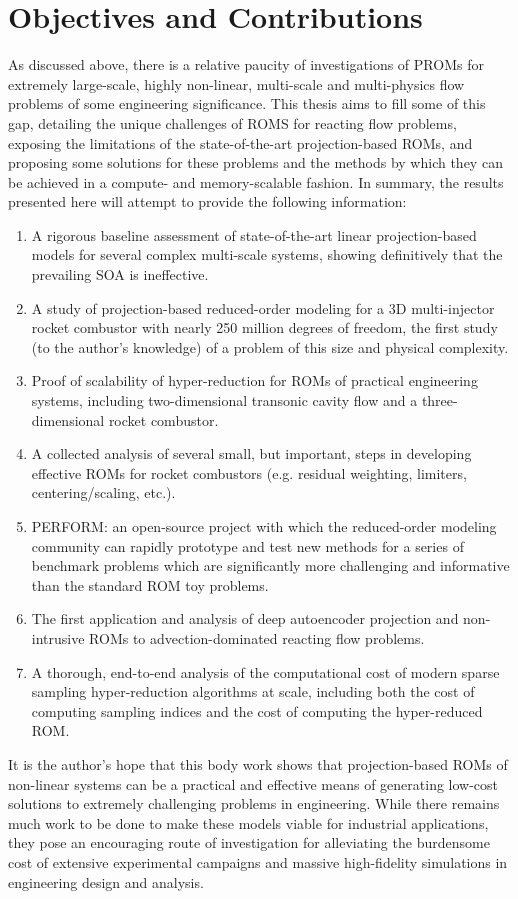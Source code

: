 \section{Objectives and Contributions}

As discussed above, there is a relative paucity of investigations of PROMs for extremely large-scale, highly non-linear, multi-scale and multi-physics flow problems of some engineering significance. This thesis aims to fill some of this gap, detailing the unique challenges of ROMS for reacting flow problems, exposing the limitations of the state-of-the-art projection-based ROMs, and proposing some solutions for these problems and the methods by which they can be achieved in a compute- and memory-scalable fashion. In summary, the results presented here will attempt to provide the following information:

\begin{enumerate}
    \item A rigorous baseline assessment of state-of-the-art linear projection-based models for several complex multi-scale systems, showing definitively that the prevailing SOA is ineffective.
    \item A study of projection-based reduced-order modeling for a 3D multi-injector rocket combustor with nearly 250 million degrees of freedom, the first study (to the author's knowledge) of a problem of this size and physical complexity.
    \item Proof of scalability of hyper-reduction for ROMs of practical engineering systems, including two-dimensional transonic cavity flow and a three-dimensional rocket combustor.
    \item A collected analysis of several small, but important, steps in developing effective ROMs for rocket combustors (e.g. residual weighting, limiters, centering/scaling, etc.).
    \item PERFORM: an open-source project with which the reduced-order modeling community can rapidly prototype and test new methods for a series of benchmark problems which are significantly more challenging and informative than the standard ROM toy problems.
    \item The first application and analysis of deep autoencoder projection and non-intrusive ROMs to advection-dominated reacting flow problems.
    \item A thorough, end-to-end analysis of the computational cost of modern sparse sampling hyper-reduction algorithms at scale, including both the cost of computing sampling indices and the cost of computing the hyper-reduced ROM.
\end{enumerate}

It is the author's hope that this body work shows that projection-based ROMs of non-linear systems can be a practical and effective means of generating low-cost solutions to extremely challenging problems in engineering. While there remains much work to be done to make these models viable for industrial applications, they pose an encouraging route of investigation for alleviating the burdensome cost of extensive experimental campaigns and massive high-fidelity simulations in engineering design and analysis.
